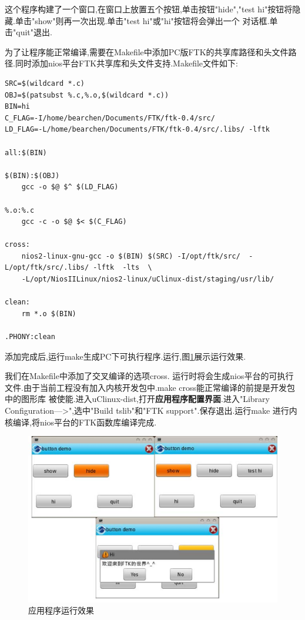 \documentclass[12pt,a4paper,titlepage]{article}
\begin{document}
这个程序构建了一个窗口,在窗口上放置五个按钮,单击按钮"hide","test hi"按钮将隐藏.单击"show"则再一次出现.单击"test hi"或"hi"按钮将会弹出一个
对话框.单击"quit"退出.

为了让程序能正常编译,需要在Makefile中添加PC版FTK的共享库路径和头文件路径.同时添加nios平台FTK共享库和头文件支持.Makefile文件如下:
\begin{verbatim}
SRC=$(wildcard *.c)
OBJ=$(patsubst %.c,%.o,$(wildcard *.c))
BIN=hi
C_FLAG=-I/home/bearchen/Documents/FTK/ftk-0.4/src/
LD_FLAG=-L/home/bearchen/Documents/FTK/ftk-0.4/src/.libs/ -lftk

all:$(BIN)

$(BIN):$(OBJ)
	gcc -o $@ $^ $(LD_FLAG)

%.o:%.c 
	gcc -c -o $@ $< $(C_FLAG)

cross:
	nios2-linux-gnu-gcc -o $(BIN) $(SRC) -I/opt/ftk/src/  -L/opt/ftk/src/.libs/ -lftk  -lts  \
	-L/opt/NiosIILinux/nios2-linux/uClinux-dist/staging/usr/lib/

clean:
	rm *.o $(BIN)

.PHONY:clean
\end{verbatim}
添加完成后,运行make生成PC下可执行程序.运行,图\ref{ftk_button}展示运行效果.

我们在Makefile中添加了交叉编译的选项cross.
运行时将会生成nios平台的可执行文件.由于当前工程没有加入内核开发包中.make cross能正常编译的前提是开发包中的图形库
被使能.进入uClinux-dist,打开\textbf{应用程序配置界面}.进入"Library Configuration--->",选中"Build tslib"和"FTK support".保存退出.运行make
进行内核编译,将nios平台的FTK函数库编译完成.
\begin{figure}[!bhtp]
\centering
\includegraphics{pic/f_ftk_button.eps}
\caption{应用程序运行效果\label{ftk_button}}
\end{figure}
\end{document}
